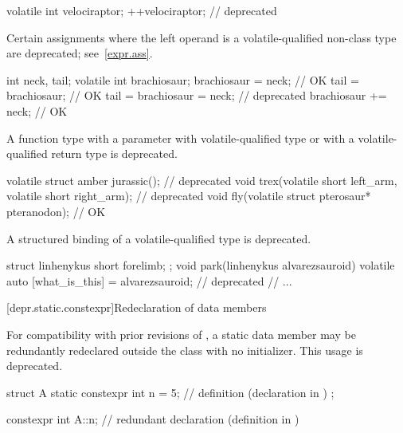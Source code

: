 \begin{example}
\begin{codeblock}
volatile int velociraptor;
++velociraptor;                     // deprecated
\end{codeblock}
\end{example}


\pnum
Certain assignments
where the left operand is a volatile-qualified non-class type
are deprecated; see~\ref{expr.ass}.

\begin{example}
\begin{codeblock}
int neck, tail;
volatile int brachiosaur;
brachiosaur = neck;                 // OK
tail = brachiosaur;                 // OK
tail = brachiosaur = neck;          // deprecated
brachiosaur += neck;                // OK
\end{codeblock}
\end{example}


\pnum
A function type
with a parameter with volatile-qualified type or
with a volatile-qualified return type is deprecated.

\begin{example}
\begin{codeblock}
volatile struct amber jurassic();                               // deprecated
void trex(volatile short left_arm, volatile short right_arm);   // deprecated
void fly(volatile struct pterosaur* pteranodon);                // OK
\end{codeblock}
\end{example}


\pnum
A structured binding of a volatile-qualified type
is deprecated.

\begin{example}
\begin{codeblock}
struct linhenykus { short forelimb; };
void park(linhenykus alvarezsauroid) {
  volatile auto [what_is_this] = alvarezsauroid;                // deprecated
  // ...
}
\end{codeblock}
\end{example}


[depr.static.constexpr]{Redeclaration of  data members}

\pnum
For compatibility with prior revisions of \Cpp{}, a 
static data member may be redundantly redeclared outside the class with no
initializer.
This usage is deprecated.
\begin{example}
\begin{codeblock}
struct A {
  static constexpr int n = 5;   // definition (declaration in \CppXIV{})
};

constexpr int A::n;             // redundant declaration (definition in \CppXIV{})
\end{codeblock}
\end{example}

